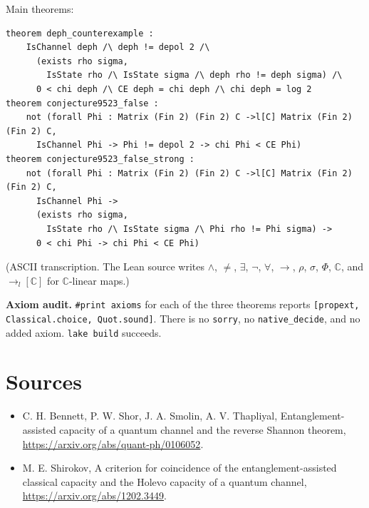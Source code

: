 \documentclass[11pt]{article}
\theoremstyle{definition}
\begin{document}
Main theorems:
\begin{verbatim}
theorem deph_counterexample :
    IsChannel deph /\ deph != depol 2 /\
      (exists rho sigma,
        IsState rho /\ IsState sigma /\ deph rho != deph sigma) /\
      0 < chi deph /\ CE deph = chi deph /\ chi deph = log 2
theorem conjecture9523_false :
    not (forall Phi : Matrix (Fin 2) (Fin 2) C ->l[C] Matrix (Fin 2) (Fin 2) C,
      IsChannel Phi -> Phi != depol 2 -> chi Phi < CE Phi)
theorem conjecture9523_false_strong :
    not (forall Phi : Matrix (Fin 2) (Fin 2) C ->l[C] Matrix (Fin 2) (Fin 2) C,
      IsChannel Phi ->
      (exists rho sigma,
        IsState rho /\ IsState sigma /\ Phi rho != Phi sigma) ->
      0 < chi Phi -> chi Phi < CE Phi)
\end{verbatim}
(ASCII transcription. The Lean source writes $\wedge$, $\neq$, $\exists$, $\neg$, $\forall$,
$\to$, $\rho$, $\sigma$, $\Phi$, $\mathbb{C}$, and $\to_l[\mathbb{C}]$ for $\mathbb{C}$-linear
maps.)

\textbf{Axiom audit.} \texttt{\#print axioms} for each of the three theorems reports
\texttt{[propext, Classical.choice, Quot.sound]}. There is no \texttt{sorry}, no
\texttt{native\_decide}, and no added axiom. \texttt{lake build} succeeds.

\section*{Sources}
\begin{itemize}
\item C. H. Bennett, P. W. Shor, J. A. Smolin, A. V. Thapliyal, Entanglement-assisted capacity of a
quantum channel and the reverse Shannon theorem, \url{https://arxiv.org/abs/quant-ph/0106052}.
\item M. E. Shirokov, A criterion for coincidence of the entanglement-assisted classical capacity and
the Holevo capacity of a quantum channel, \url{https://arxiv.org/abs/1202.3449}.
\end{itemize}
\end{document}
